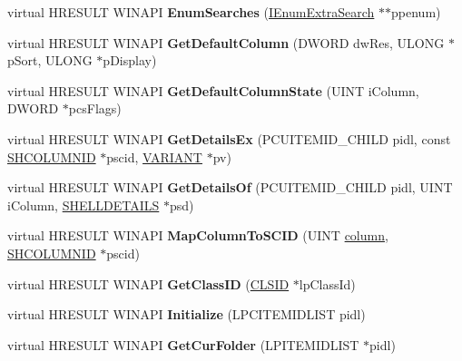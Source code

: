 \begin{DoxyCompactItemize}
virtual H\+R\+E\+S\+U\+LT W\+I\+N\+A\+PI {\bfseries Enum\+Searches} (\hyperlink{interface_i_enum_extra_search}{I\+Enum\+Extra\+Search} $\ast$$\ast$ppenum)
\item 
\mbox{\label{class_c_control_panel_folder_ad9ff090699ed3a39a4795ad31b33fc92}} 
virtual H\+R\+E\+S\+U\+LT W\+I\+N\+A\+PI {\bfseries Get\+Default\+Column} (D\+W\+O\+RD dw\+Res, U\+L\+O\+NG $\ast$p\+Sort, U\+L\+O\+NG $\ast$p\+Display)
\item 
\mbox{\label{class_c_control_panel_folder_a824cf81abf8d72d3203c8847e1f86048}} 
virtual H\+R\+E\+S\+U\+LT W\+I\+N\+A\+PI {\bfseries Get\+Default\+Column\+State} (U\+I\+NT i\+Column, D\+W\+O\+RD $\ast$pcs\+Flags)
\item 
\mbox{\label{class_c_control_panel_folder_a48d67e1d54ee835ebcbf7d71e458f11b}} 
virtual H\+R\+E\+S\+U\+LT W\+I\+N\+A\+PI {\bfseries Get\+Details\+Ex} (P\+C\+U\+I\+T\+E\+M\+I\+D\+\_\+\+C\+H\+I\+LD pidl, const \hyperlink{struct_i_shell_folder2_1_1_s_h_c_o_l_u_m_n_i_d}{S\+H\+C\+O\+L\+U\+M\+N\+ID} $\ast$pscid, \hyperlink{structtag_v_a_r_i_a_n_t}{V\+A\+R\+I\+A\+NT} $\ast$pv)
\item 
\mbox{\label{class_c_control_panel_folder_ac669683d0d75bdd6091d4b64ab4acb2c}} 
virtual H\+R\+E\+S\+U\+LT W\+I\+N\+A\+PI {\bfseries Get\+Details\+Of} (P\+C\+U\+I\+T\+E\+M\+I\+D\+\_\+\+C\+H\+I\+LD pidl, U\+I\+NT i\+Column, \hyperlink{struct_s_h_e_l_l_d_e_t_a_i_l_s}{S\+H\+E\+L\+L\+D\+E\+T\+A\+I\+LS} $\ast$psd)
\item 
\mbox{\label{class_c_control_panel_folder_a35a01388a5a87979fd331a80f088cf19}} 
virtual H\+R\+E\+S\+U\+LT W\+I\+N\+A\+PI {\bfseries Map\+Column\+To\+S\+C\+ID} (U\+I\+NT \hyperlink{structcolumn}{column}, \hyperlink{struct_i_shell_folder2_1_1_s_h_c_o_l_u_m_n_i_d}{S\+H\+C\+O\+L\+U\+M\+N\+ID} $\ast$pscid)
\item 
\mbox{\label{class_c_control_panel_folder_a87d8da475bc92e2c99a476a7d5803ea2}} 
virtual H\+R\+E\+S\+U\+LT W\+I\+N\+A\+PI {\bfseries Get\+Class\+ID} (\hyperlink{struct___i_i_d}{C\+L\+S\+ID} $\ast$lp\+Class\+Id)
\item 
\mbox{\label{class_c_control_panel_folder_aabe6b526536af49a4bc1939d5df98e9d}} 
virtual H\+R\+E\+S\+U\+LT W\+I\+N\+A\+PI {\bfseries Initialize} (L\+P\+C\+I\+T\+E\+M\+I\+D\+L\+I\+ST pidl)
\item 
\mbox{\label{class_c_control_panel_folder_aebdc8e0093061a7ae56d976d79abd131}} 
virtual H\+R\+E\+S\+U\+LT W\+I\+N\+A\+PI {\bfseries Get\+Cur\+Folder} (L\+P\+I\+T\+E\+M\+I\+D\+L\+I\+ST $\ast$pidl)
\end{DoxyCompactItemize}
